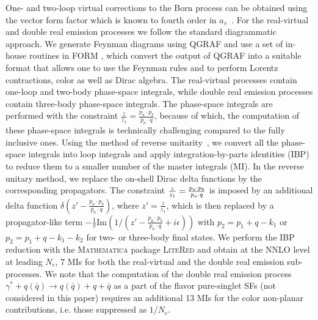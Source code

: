 \documentclass[%
 twocolumn,
 superscriptaddress,
 preprintnumbers,
 nofootinbib,
 amsmath,amssymb,
 aps,
 prl,
]{revtex4}
\begin{document}
One- and two-loop virtual corrections to the Born process can be obtained using the vector form factor 
which is known to fourth order in $a_s$~\cite{Lee:2022nhh}.  
For the real-virtual and double real emission processes we follow
the standard diagrammatic approach. We generate Feynman diagrams using \textsc{QGRAF} \cite{Nogueira:1991ex} 
and use a set of in-house routines in \textsc{FORM} \cite{Kuipers:2012rf,Ruijl:2017dtg}, which convert the output of
\textsc{QGRAF} into a suitable format that allows one to use the Feynman rules and to perform Lorentz contractions, color as well as Dirac algebra.  
The real-virtual processes contain one-loop and two-body phase-space integrals, while double real emission processes contain three-body phase-space integrals. 
The phase-space integrals are performed with the constraint 
$\frac{z}{z_{1}} = \frac{p_a \cdot p_b}{p_a\cdot q}$, because of which, the computation of these phase-space integrals is technically challenging 
compared to the fully inclusive ones. 
Using the method of reverse unitarity~\cite{Anastasiou:2003gr,Anastasiou:2012kq},
we convert all the phase-space integrals into loop integrals and apply integration-by-parts identities (IBP) 
\cite{Chetyrkin:1981qh,Laporta:2001dd} to reduce them to a smaller number of the master integrals (MI).   
In the reverse unitary method, we replace the on-shell Dirac delta functions by the 
corresponding propagators. 
The constraint ${z\over z_{1}}= \frac{p_a \cdot p_b}{p_a \cdot q}$ is imposed by an additional delta function $\delta \left(z' - \frac{p_a \cdot p_b}{p_a \cdot q} \right)$, 
where $z'=\frac{z}{z_1}$, which is then replaced by a propagator-like term 
$-\frac{1}{\pi}\text{Im}(1/(z' - \frac{p_a \cdot p_b}{p_a \cdot q} + i \epsilon))$ 
with $p_2 = p_1 + q - k_1$ or $p_2 = p_1 + q - k_1 - k_2$ 
for two- or three-body final states. 
We perform the IBP reduction with the \textsc{Mathematica} package \textsc{LiteRed} \cite{Lee:2013mka} and obtain at the NNLO level at leading $N_c$, 7 MIs for both the real-virtual and the double real emission sub-processes.
We note that the computation of the double real emission process $\gamma^* + q(\bar{q}) \rightarrow q(\bar{q}) + q + \bar{q}$ as a part of the flavor pure-singlet SFs (not considered in this paper)
requires an additional 13 MIs for the color non-planar contributions, i.e. those suppressed as $1/N_c$.
\end{document}
